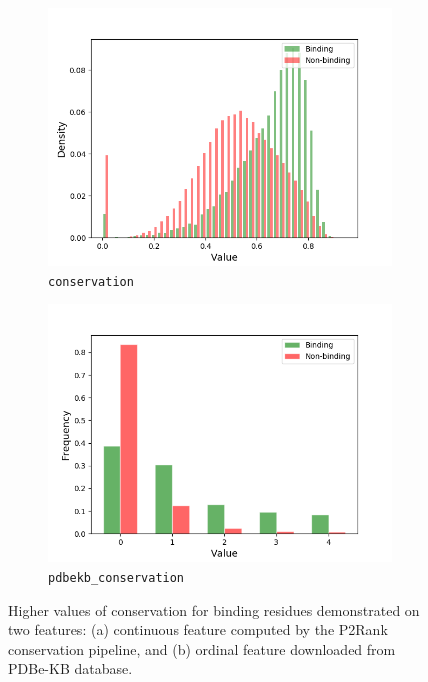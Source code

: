 \begin{figure}[]
\centering
\begin{subfigure}{.5\textwidth}
  \centering
  \includegraphics[width=1\linewidth]{../img/conservation_hist.png}
  \caption{\texttt{conservation}}
\end{subfigure}%
\begin{subfigure}{.5\textwidth}
  \centering
  \includegraphics[width=1\linewidth]{../img/pdbekb_conservation_frequencies.png}
  \caption{\texttt{pdbekb\_conservation}}
\end{subfigure}
\caption[Conservation features]{Higher values of conservation for binding residues demonstrated on two features: (a) continuous feature computed by the P2Rank conservation pipeline, and (b) ordinal feature downloaded from PDBe-KB database.}
\label{fig:conservation}
\end{figure}

